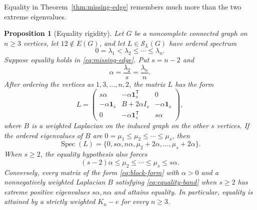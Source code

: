 \documentclass[11pt,reqno]{amsart}
\newtheorem{proposition}[theorem]{Proposition}
\theoremstyle{definition}
\theoremstyle{remark}
\newcommand{\one}{\mathbf 1}
\newcommand{\SL}{\mathcal S_L}
\newcommand{\Spec}{\operatorname{Spec}}
\begin{document}
Equality in Theorem~\ref{thm:missing-edge} remembers much more than the two
extreme eigenvalues.

\begin{proposition}[Equality rigidity]\label{prop:equality-form}
Let $G$ be a noncomplete connected graph on $n\ge3$ vertices, let
$12\notin E(G)$, and let $L\in\SL(G)$ have ordered spectrum
\[
  0=\lambda_1<\lambda_2\le\cdots\le\lambda_n.
\]
Suppose equality holds in \eqref{eq:missing-edge}.  Put $s=n-2$ and
\[
  \alpha=\frac{\lambda_2}{s}=\frac{\lambda_n}{n}.
\]
After ordering the vertices as $1,3,\ldots,n,2$, the matrix $L$ has the form
\begin{equation}\label{eq:block-form}
  L=
  \begin{pmatrix}
    s\alpha&-\alpha\one_s^{\mathsf T}&0\\
    -\alpha\one_s&B+2\alpha I_s&-\alpha\one_s\\
    0&-\alpha\one_s^{\mathsf T}&s\alpha
  \end{pmatrix},
\end{equation}
where $B$ is a weighted Laplacian on the induced graph on the other $s$
vertices.  If the ordered eigenvalues of $B$ are
$0=\mu_1\le\mu_2\le\cdots\le\mu_s$, then
\begin{equation}\label{eq:block-spectrum}
  \Spec(L)=\{0,s\alpha,n\alpha,
  \mu_2+2\alpha,\ldots,\mu_s+2\alpha\}.
\end{equation}
When $s\ge2$, the equality hypothesis also forces
\begin{equation}\label{eq:equality-band}
  (s-2)\alpha\le\mu_2\le\cdots\le\mu_s\le s\alpha.
\end{equation}
Conversely, every matrix of the form \eqref{eq:block-form} with $\alpha>0$
and a nonnegatively weighted Laplacian $B$ satisfying
\eqref{eq:equality-band} when $s\ge2$ has extreme positive eigenvalues
$s\alpha,n\alpha$ and attains equality.
In particular, equality is attained by a strictly weighted $K_n-e$ for every
$n\ge3$.
\end{proposition}
\end{document}
